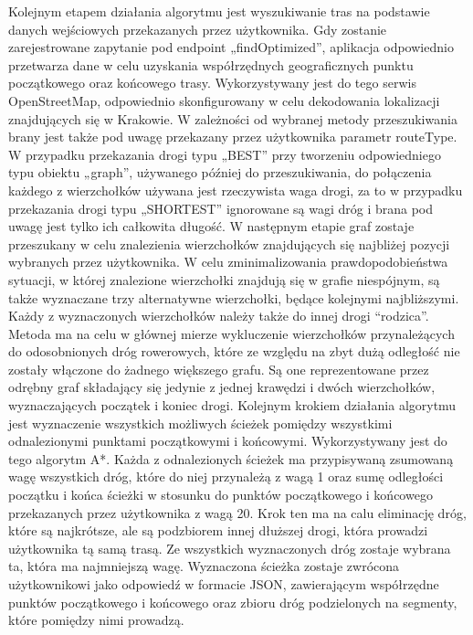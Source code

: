 Kolejnym etapem działania algorytmu jest wyszukiwanie tras na podstawie danych wejściowych przekazanych przez użytkownika. Gdy zostanie zarejestrowane zapytanie pod endpoint „findOptimized”, aplikacja odpowiednio przetwarza dane w celu uzyskania współrzędnych geograficznych punktu początkowego oraz końcowego trasy. Wykorzystywany jest do tego serwis OpenStreetMap, odpowiednio skonfigurowany w celu dekodowania lokalizacji znajdujących się w Krakowie. W zależności od wybranej metody przeszukiwania brany jest także pod uwagę przekazany przez użytkownika parametr routeType. W przypadku przekazania drogi typu „BEST” przy tworzeniu odpowiedniego typu obiektu „graph”, używanego później do przeszukiwania, do połączenia każdego z wierzchołków używana jest rzeczywista waga drogi, za to w przypadku przekazania drogi typu „SHORTEST” ignorowane są wagi dróg i brana pod uwagę jest tylko ich całkowita długość.\newline
W następnym etapie graf zostaje przeszukany w celu znalezienia wierzchołków znajdujących się najbliżej pozycji wybranych przez użytkownika. W celu zminimalizowania prawdopodobieństwa sytuacji, w której znalezione wierzchołki znajdują się w grafie niespójnym, są także wyznaczane trzy alternatywne wierzchołki, będące kolejnymi najbliższymi. Każdy z wyznaczonych wierzchołków należy także do innej drogi ``rodzica''. Metoda ma na celu w głównej mierze wykluczenie wierzchołków przynależących do odosobnionych dróg rowerowych, które ze względu na zbyt dużą odległość nie zostały włączone do żadnego większego grafu. Są one reprezentowane przez odrębny graf składający się jedynie z jednej krawędzi i dwóch wierzchołków, wyznaczających początek i koniec drogi.
Kolejnym krokiem działania algorytmu jest wyznaczenie wszystkich możliwych ścieżek pomiędzy wszystkimi odnalezionymi punktami początkowymi i końcowymi. Wykorzystywany jest do tego algorytm A*. Każda z odnalezionych ścieżek ma przypisywaną zsumowaną wagę wszystkich dróg, które do niej przynależą z wagą 1 oraz sumę odległości początku i końca ścieżki w stosunku do punktów początkowego i końcowego przekazanych przez użytkownika z wagą 20. Krok ten ma na calu eliminację dróg, które są najkrótsze, ale są podzbiorem innej dłuższej drogi, która prowadzi użytkownika tą samą trasą. Ze wszystkich wyznaczonych dróg zostaje wybrana ta, która ma najmniejszą wagę. \newline
Wyznaczona ścieżka zostaje zwrócona użytkownikowi jako odpowiedź w formacie JSON, zawierającym współrzędne punktów początkowego i końcowego oraz zbioru dróg podzielonych na segmenty, które pomiędzy nimi prowadzą.

